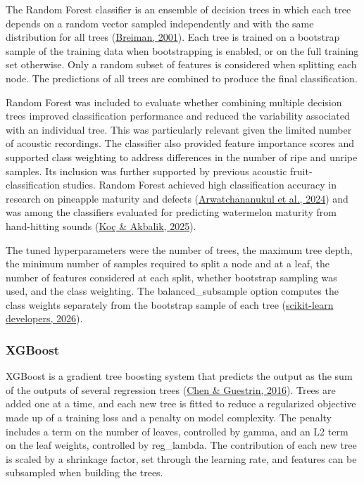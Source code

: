 \begin{thesisprose}
The Random Forest classifier is an ensemble of decision trees in which each tree depends on a random vector sampled independently and with the same distribution for all trees (\hyperlink{cite.breiman2001}{Breiman, 2001}). Each tree is trained on a bootstrap sample of the training data when bootstrapping is enabled, or on the full training set otherwise. Only a random subset of features is considered when splitting each node. The predictions of all trees are combined to produce the final classification.

Random Forest was included to evaluate whether combining multiple decision trees improved classification performance and reduced the variability associated with an individual tree. This was particularly relevant given the limited number of acoustic recordings. The classifier also provided feature importance scores and supported class weighting to address differences in the number of ripe and unripe samples. Its inclusion was further supported by previous acoustic fruit-classification studies. Random Forest achieved high classification accuracy in research on pineapple maturity and defects (\hyperlink{cite.arwatchananukul2024}{Arwatchananukul et al., 2024}) and was among the classifiers evaluated for predicting watermelon maturity from hand-hitting sounds (\hyperlink{cite.koc2025}{Koç \& Akbalik, 2025}).

The tuned hyperparameters were the number of trees, the maximum tree depth, the minimum number of samples required to split a node and at a leaf, the number of features considered at each split, whether bootstrap sampling was used, and the class weighting. The balanced\_\allowbreak{}subsample option computes the class weights separately from the bootstrap sample of each tree (\hyperlink{cite.scikit2026}{scikit-learn developers, 2026}).

\subsubsection*{XGBoost}

XGBoost is a gradient tree boosting system that predicts the output as the sum of the outputs of several regression trees (\hyperlink{cite.chen2016}{Chen \& Guestrin, 2016}). Trees are added one at a time, and each new tree is fitted to reduce a regularized objective made up of a training loss and a penalty on model complexity. The penalty includes a term on the number of leaves, controlled by gamma, and an L2 term on the leaf weights, controlled by reg\_\allowbreak{}lambda. The contribution of each new tree is scaled by a shrinkage factor, set through the learning rate, and features can be subsampled when building the trees.


\end{thesisprose}
